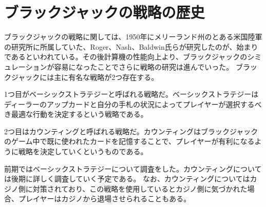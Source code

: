
\section{ブラックジャックの戦略の歴史}
ブラックジャックの戦略に関しては、1950年にメリーランド州のとある米国陸軍の研究所に所属していた、Roger、Nash、Baldwin氏らが研究したのが、始まりであるといわれている。その後計算機の性能向上より、ブラックジャックのシミュレーションが容易になったことでさらに戦略の研究は進んでいった。
ブラックジャックには主に有名な戦略が2つ存在する。

1つ目がベーシックストラテジーと呼ばれる戦略だ。ベーシックストラテジーはディーラーのアップカードと自分の手札の状況によってプレイヤーが選択するべき最適な行動を決定するという戦略である。

2つ目はカウンティングと呼ばれる戦略だ。カウンティングはブラックジャックのゲーム中で既に使われたカードを記憶することで、プレイヤーが有利になるように戦略を決定していくというものである。

前期ではベーシックストラテジーについて調査をした。カウンティングについては後期に詳しく調査していく予定である。
なお、カウンティングについてはカジノ側に対策されており、この戦略を使用しているとカジノ側に気づかれた場合、プレイヤーはカジノから退場させられることもある。
